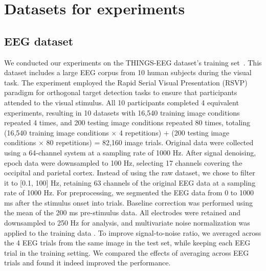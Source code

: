\documentclass{article}
\begin{document}



\section{Datasets for experiments}
\label{sec:dataset_description}
\subsection{EEG dataset}
We conducted our experiments on the THINGS-EEG dataset's training set~\cite{gifford2022large, grootswagers2022human}. This dataset includes a large EEG corpus from 10 human subjects during the visual task. The experiment employed the Rapid Serial Visual Presentation (RSVP) paradigm for orthogonal target detection tasks to ensure that participants attended to the visual stimulus. All 10 participants completed 4 equivalent experiments, resulting in 10 datasets with 16,540 training image conditions repeated 4 times, and 200 testing image conditions repeated 80 times, totaling (16,540 training image conditions \(\times\) 4 repetitions) + (200 testing image conditions \(\times\) 80 repetitions) = 82,160 image trials. Original data were collected using a 64-channel system at a sampling rate of 1000 Hz. After signal denoising, epoch data were downsampled to 100 Hz, selecting 17 channels covering the occipital and parietal cortex. Instead of using the raw dataset, we chose to filter it to [0.1, 100] Hz, retaining 63 channels of the original EEG data at a sampling rate of 1000 Hz. For preprocessing, we segmented the EEG data from 0 to 1000 ms after the stimulus onset into trials. Baseline correction was performed using the mean of the 200 ms pre-stimulus data. All electrodes were retained and downsampled to 250 Hz for analysis, and multivariate noise normalization was applied to the training data \cite{guggenmos2018multivariate}. 
To improve signal-to-noise ratio, we averaged across the 4 EEG trials from the same image in the test set, while keeping each EEG trial in the training setting. We compared the effects of averaging across EEG trials and found it indeed improved the performance.
\end{document}
